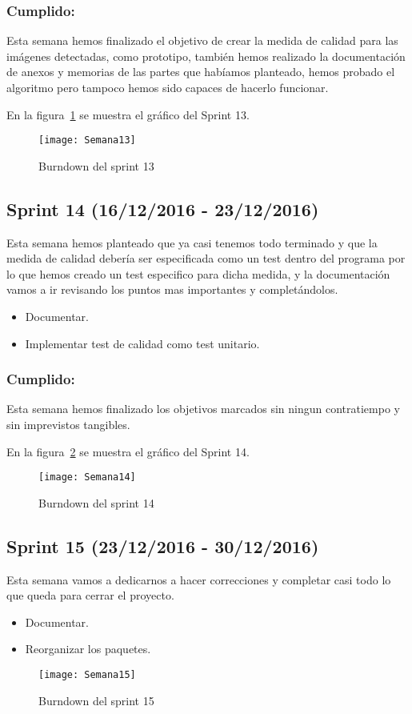 \subsubsection{Cumplido:}
Esta semana hemos finalizado el objetivo de crear la medida de calidad para las imágenes detectadas, como prototipo, también hemos realizado la documentación de anexos y memorias de las partes que habíamos planteado, hemos probado el algoritmo pero tampoco hemos sido capaces de hacerlo funcionar.


En la figura~\ref{fig:A.2.13} se muestra el gráfico del Sprint 13.

\begin{figure}[h]
\centering
\texttt{[image: Semana13]}
\caption{Burndown del sprint 13}
\label{fig:A.2.13}
\end{figure}

\subsection{Sprint 14 (16/12/2016 - 23/12/2016)}
Esta semana hemos planteado que ya casi tenemos todo terminado y que la medida de calidad debería ser especificada como un test dentro del programa por lo que hemos creado un test especifico para dicha medida, y la documentación vamos a ir revisando los puntos mas importantes y completándolos.

\begin{itemize}
	\item Documentar.
	\item Implementar test de calidad como test unitario.
\end{itemize}
\subsubsection{Cumplido:}
Esta semana hemos finalizado los objetivos marcados sin ningun contratiempo y sin imprevistos tangibles.

En la figura~\ref{fig:A.2.14} se muestra el gráfico del Sprint 14.

\begin{figure}[h]
\centering
\texttt{[image: Semana14]}
\caption{Burndown del sprint 14}
\label{fig:A.2.14}
\end{figure}

\subsection{Sprint 15 (23/12/2016 - 30/12/2016)}
Esta semana vamos a dedicarnos a hacer correcciones y completar casi todo lo que queda para cerrar el proyecto.
\begin{itemize}
	\item Documentar.
	\item Reorganizar los paquetes.
\end{itemize}
\begin{figure}[h]
\centering
\texttt{[image: Semana15]}
\caption{Burndown del sprint 15}
\label{fig:A.2.15}
\end{figure}


